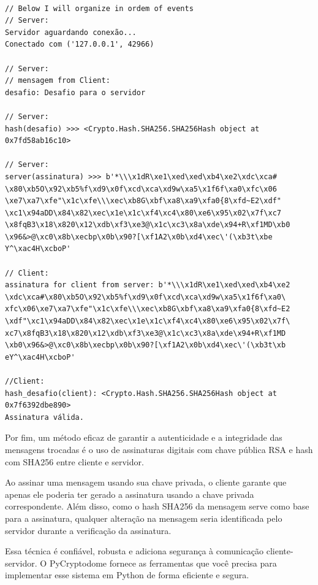 \documentclass[a4paper,12pt]{article}
\newcommand{\printingbibliography}{%

    \pagestyle{myheadings}
    \markright{}
    \sloppy
    \printbibliography[heading=bibintoc, %
                   title=Refer\^encias %
                  ]
    \fussy%
}
\begin{document}
\begin{listing}[!ht]
\begin{verbatim}

// Below I will organize in ordem of events
// Server:
Servidor aguardando conexão...
Conectado com ('127.0.0.1', 42966)

// Server:
// mensagem from Client:
desafio: Desafio para o servidor

// Server:
hash(desafio) >>> <Crypto.Hash.SHA256.SHA256Hash object at 0x7fd58ab16c10>

// Server:
server(assinatura) >>> b'*\\\x1dR\xe1\xed\xed\xb4\xe2\xdc\xca#
\x80\xb5O\x92\xb5%f\xd9\x0f\xcd\xca\xd9w\xa5\x1f6f\xa0\xfc\x06
\xe7\xa7\xfe"\x1c\xfe\\\xec\xb8G\xbf\xa8\xa9\xfa0{8\xfd~E2\xdf"
\xc1\x94aDD\x84\x82\xec\x1e\x1c\xf4\xc4\x80\xe6\x95\x02\x7f\xc7
\x8fqB3\x18\x820\x12\xdb\xf3\xe3@\x1c\xc3\x8a\xde\x94+R\xf1MD\xb0
\x96&>@\xc0\x8b\xecbp\x0b\x90?[\xf1A2\x0b\xd4\xec\'(\xb3t\xbe
Y^\xac4H\xcboP'

// Client:
assinatura for client from server: b'*\\\x1dR\xe1\xed\xed\xb4\xe2
\xdc\xca#\x80\xb5O\x92\xb5%f\xd9\x0f\xcd\xca\xd9w\xa5\x1f6f\xa0\
xfc\x06\xe7\xa7\xfe"\x1c\xfe\\\xec\xb8G\xbf\xa8\xa9\xfa0{8\xfd~E2
\xdf"\xc1\x94aDD\x84\x82\xec\x1e\x1c\xf4\xc4\x80\xe6\x95\x02\x7f\
xc7\x8fqB3\x18\x820\x12\xdb\xf3\xe3@\x1c\xc3\x8a\xde\x94+R\xf1MD
\xb0\x96&>@\xc0\x8b\xecbp\x0b\x90?[\xf1A2\x0b\xd4\xec\'(\xb3t\xb
eY^\xac4H\xcboP'

//Client:
hash_desafio(client): <Crypto.Hash.SHA256.SHA256Hash object at 0x7f6392dbe890>
Assinatura válida.

\end{verbatim}
\end{listing}

\newpage
Por fim, um método eficaz de garantir a autenticidade e a integridade das 
mensagens trocadas é o uso de assinaturas digitais com chave pública RSA e 
hash com SHA256 entre cliente e servidor.

Ao assinar uma mensagem usando sua chave privada, o cliente garante que apenas 
ele poderia ter gerado a assinatura usando a chave privada correspondente. Além disso, 
como o hash SHA256 da mensagem serve como base para a assinatura, qualquer alteração 
na mensagem seria identificada pelo servidor durante a verificação da assinatura.

Essa técnica é confiável, robusta e adiciona segurança à comunicação cliente-servidor. 
O PyCryptodome fornece as ferramentas que você precisa para implementar esse sistema em 
Python de forma eficiente e segura.

\printingbibliography
\end{document}
